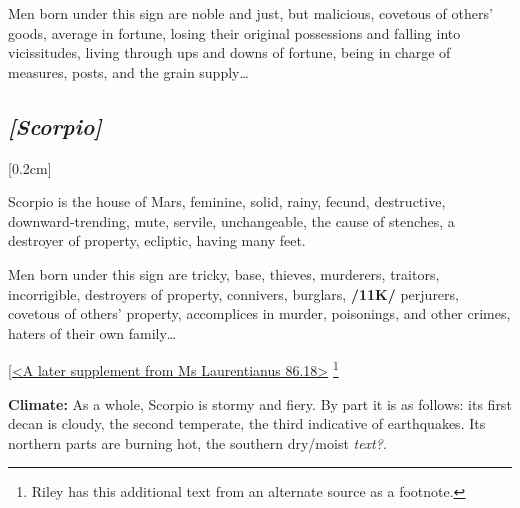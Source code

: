 Men born under this sign are noble and just, but malicious, covetous of others’ goods, average in fortune, losing their original possessions and falling into vicissitudes, living through ups and downs of fortune, being in charge of measures, posts, and the grain supply\ldots



\secbr
\subsection{\textit{[Scorpio]}}
[0.2cm]

 Scorpio is the house of Mars,  feminine,  solid,  rainy, fecund, destructive, downward-trending,  mute,  servile, unchangeable, the cause of stenches, a destroyer of property,  ecliptic, having many feet. 

Men born under this sign are tricky, base, thieves, murderers, traitors, incorrigible, destroyers of property, connivers, burglars, \textbf{/11K/} perjurers, covetous of others’ property, accomplices in murder, poisonings, and other crimes, haters of their own family\ldots

\noindent
[\underline{<A later supplement from Ms Laurentianus 86.18>}
\footnote{Riley has this additional text from an alternate source as a footnote.}  

\textbf{Climate:} As a whole, Scorpio is stormy and fiery. By part it is as follows: its first decan is cloudy, the second temperate, the third indicative of earthquakes. Its northern parts are burning hot, the southern dry/moist \textit{text?}. 

